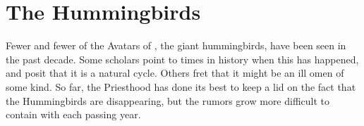 \documentclass[blue]{GL2020}
\begin{document}
\section*{The Hummingbirds}
Fewer and fewer of the Avatars of \cFarmGod{}, the giant hummingbirds, have been seen in the past decade.  Some scholars point to times in history when this has happened, and posit that it is a natural cycle.  Others fret that it might be an ill omen of some kind.  So far, the Priesthood has done its best to keep a lid on the fact that the Hummingbirds are disappearing, but the rumors grow more difficult to contain with each passing year.
\end{document}
